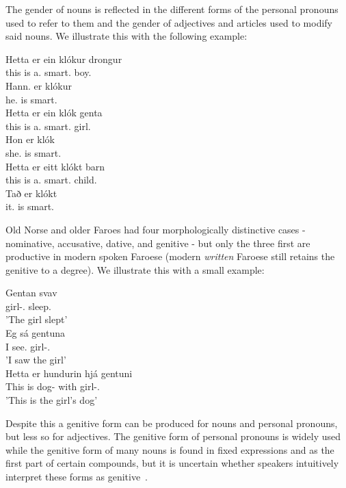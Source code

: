 \documentclass[12pt,%
    times,
]{lin-v2/lin}
\begin{document}
The gender of nouns is reflected in the different forms of the personal pronouns used to refer to them and the
gender of adjectives and articles used to modify said nouns. We illustrate this with the following example:
\begin{exe}
    \ex
    \gll Hetta er ein klókur drongur\\
    this is a.\M{} smart.\M{} boy.\M\\
    Hann. er klókur\\
    he.\M{} is smart.\M\\
    \gll Hetta er ein klók genta\\
    this is a.\F{} smart.\F{} girl.\F\\
    Hon er klók\\
    she.\F{} is smart.\F{}\\
    \gll Hetta er eitt klókt barn\\
    this is a.\N{} smart.\N{} child.\N\\
    Tað er klókt\\
    it.\N{} is smart.\N\\
\end{exe}

Old Norse and older Faroes had four morphologically distinctive cases - nominative, accusative, dative, and genitive -
but only the three first are productive in modern spoken Faroese (modern \emph{written} Faroese still retains the genitive
to a degree). We illustrate this with a small example:
\begin{exe}
    \ex
    \gll Gentan svav\\
    girl-\Det.\Nom{} sleep.\Pst\\
    \trans 'The girl slept'\\
    \gll Eg sá gentuna\\
    I see.\Pst{} girl-\Det.\Acc\\
    \trans 'I saw the girl'\\
    \gll Hetta er hundurin hjá gentuni\\
    This is dog-\Det{} with girl-\Det.\Dat\\
    \trans 'This is the girl'{}s dog'
\end{exe}

Despite this a genitive form can be produced for nouns and personal pronouns, but less so for adjectives. The genitive form
of personal pronouns is widely used while the genitive form of many nouns is found in fixed expressions and as the first
part of certain compounds, but it is uncertain whether speakers intuitively interpret these forms as genitive~\citep[62]{faroese}.
\end{document}
